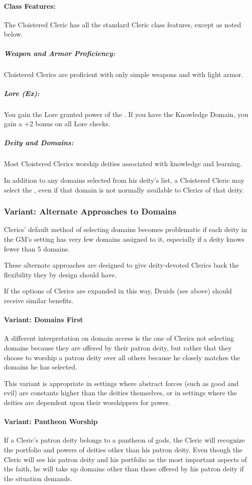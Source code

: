 \paragraph{Class Features:}
The Cloistered Cleric has all the standard Cleric class features, except as noted below.

\subparagraph{Weapon and Armor Proficiency:}
Cloistered Clerics are proficient with only simple weapons and with light armor.

\subparagraph{Lore (Ex):}
You gain the Lore granted power of the .
If you have the Knowledge Domain, you gain a +2 bonus on all Lore checks.

\subparagraph{Deity and Domains:}
Most Cloistered Clerics worship deities associated with knowledge and learning.

In addition to any domains selected from his deity's list, a Cloistered Cleric may select the , even if that  domain is not normally available to Clerics of that deity.
\subsubsection{Variant: Alternate Approaches to Domains}
Clerics' default method of selecting domains becomes problematic if each deity in the GM's setting has very few domains assigned to it, especially if a deity knows fewer than 5 domains.

These alternate approaches are designed to give deity-devoted Clerics back the flexibility they by design should have.

If the options of Clerics are expanded in this way, Druids (see above) should receive similar benefits.
\paragraph{Variant: Domains First}
A different interpretation on domain access is the one of 
Clerics not selecting domains because they are offered by their patron deity, but rather that they choose to worship a patron deity over all others because he closely matches the domains he has selected.

This variant is appropriate in settings where abstract forces (such as good and evil) are constants higher than the deities themselves, or in settings where the deities are dependent upon their worshippers for power.
\paragraph{Variant: Pantheon Worship}
If a Cleric's patron deity belongs to a pantheon of gods, the Cleric will recognize the portfolio and powers of deities other than his patron deity.
Even though the Cleric will see his patron deity and his portfolio as the most important aspects of the faith, he will take up domains other than those offered by his patron deity if the situation demands.

